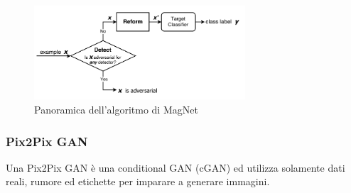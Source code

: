             \begin{figure}[!h]
                \centering
                \includegraphics[width=0.7\textwidth]{Images/Mitigation/MagNet.png}
                \caption{Panoramica dell'algoritmo di MagNet}
                \label{MagNet}
            \end{figure}
    
        \subsubsection{Pix2Pix GAN}
        \label{Pix2Pix GAN}
        Una Pix2Pix GAN %
        \cite{isola2016image} è una conditional GAN (cGAN) %
        \cite{mirza2014conditional} ed utilizza solamente dati reali, rumore ed etichette per imparare a generare immagini.
        
